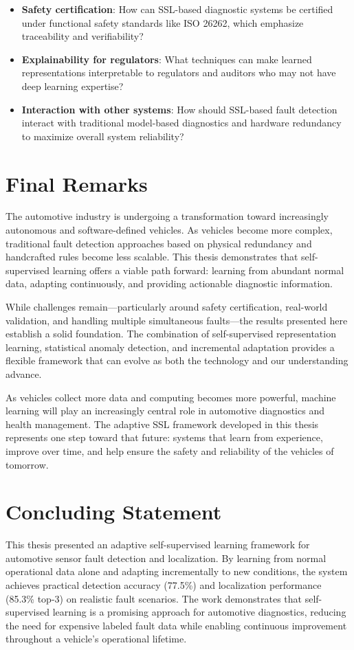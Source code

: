 \begin{itemize}
    \item \textbf{Safety certification}: How can SSL-based diagnostic systems be certified under functional safety standards like ISO 26262, which emphasize traceability and verifiability?

    \item \textbf{Explainability for regulators}: What techniques can make learned representations interpretable to regulators and auditors who may not have deep learning expertise?

    \item \textbf{Interaction with other systems}: How should SSL-based fault detection interact with traditional model-based diagnostics and hardware redundancy to maximize overall system reliability?
\end{itemize}

\section{Final Remarks}

The automotive industry is undergoing a transformation toward increasingly autonomous and software-defined vehicles. As vehicles become more complex, traditional fault detection approaches based on physical redundancy and handcrafted rules become less scalable. This thesis demonstrates that self-supervised learning offers a viable path forward: learning from abundant normal data, adapting continuously, and providing actionable diagnostic information.

While challenges remain—particularly around safety certification, real-world validation, and handling multiple simultaneous faults—the results presented here establish a solid foundation. The combination of self-supervised representation learning, statistical anomaly detection, and incremental adaptation provides a flexible framework that can evolve as both the technology and our understanding advance.

As vehicles collect more data and computing becomes more powerful, machine learning will play an increasingly central role in automotive diagnostics and health management. The adaptive SSL framework developed in this thesis represents one step toward that future: systems that learn from experience, improve over time, and help ensure the safety and reliability of the vehicles of tomorrow.

\section*{Concluding Statement}

This thesis presented an adaptive self-supervised learning framework for automotive sensor fault detection and localization. By learning from normal operational data alone and adapting incrementally to new conditions, the system achieves practical detection accuracy (77.5\%) and localization performance (85.3\% top-3) on realistic fault scenarios. The work demonstrates that self-supervised learning is a promising approach for automotive diagnostics, reducing the need for expensive labeled fault data while enabling continuous improvement throughout a vehicle's operational lifetime.
